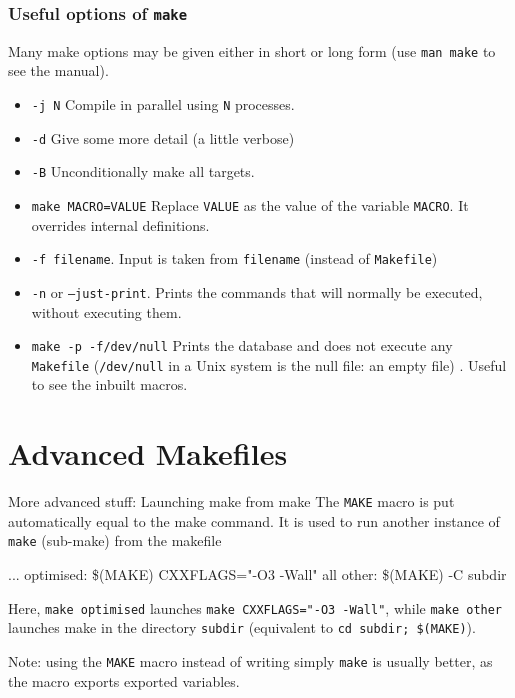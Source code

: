 \documentclass[10pt,aspectratio=169]{beamer}
\begin{document}
\begin{frame}
    \frametitle{Useful options of \texttt{make}}
    Many make options may be given either in short or long form (use \texttt{man make} to see the manual).
    \begin{itemize}
        \item \texttt{-j N} Compile in parallel using \texttt{N} processes.
        \item \texttt{-d} Give some more detail (a little verbose)
        \item \texttt{-B} Unconditionally make all targets.
        \item \texttt{make MACRO=VALUE} Replace \texttt{VALUE} as the value of the variable
        \texttt{MACRO}. It overrides internal definitions.
        \item \texttt{-f filename}. Input is taken from \texttt{filename} (instead of \texttt{Makefile})
        \item \texttt{-n} or \texttt{--just-print}. Prints the commands 
        that will normally be executed, without executing them.
        \item \texttt{make -p -f/dev/null} Prints the database and does not execute any
        \texttt{Makefile} (\texttt{/dev/null} in a Unix system is the null file: an empty file) . Useful to see the inbuilt macros.
    \end{itemize}
\end{frame}

\section*{Advanced Makefiles}
\begin{frame}{More advanced stuff: Launching make from make}
The \texttt{MAKE} macro is put automatically equal to the make command. It is used to run
another instance of \texttt{make} (sub-make) from the makefile
\vspace*{-.3cm}
\begin{semiverbatim}
...\newline
optimised:\newline
\phantom{xx} \$(MAKE) CXXFLAGS="-O3 -Wall" all\newline
other:\newline
\phantom{xx} \$(MAKE) -C subdir
\end{semiverbatim}

Here, \texttt{make optimised} launches \texttt{make CXXFLAGS="-O3
  -Wall"}, while \texttt{make other} launches make in the directory \texttt{subdir} (equivalent to \texttt{cd subdir; \$(MAKE)}).

Note: using the \texttt{MAKE} macro instead of writing simply
\texttt{make} is usually better, as the macro exports exported variables.
\end{frame}
\end{document}
